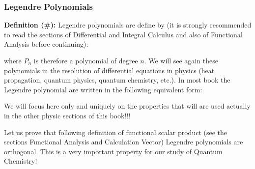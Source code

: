 	\subsubsection{Legendre Polynomials}\label{legendre polynomials}
	\textbf{Definition (\#\mydef):} Legendre polynomials are define by (it is strongly recommended to read the sections of Differential and Integral Calculus and also of Functional Analysis before continuing):
	
	where $P_n$ is therefore a polynomial of degree $n$. We will see again these polynomials in the resolution of differential equations in physics (heat propagation, quantum physics, quantum chemistry, etc.). In most book the Legendre polynomial are written in the following equivalent form:
	
	We will focus here only and uniquely on the properties that will are used actually in the other physic sections of this book!!!
	
	Let us prove that following definition of functional scalar product (see the sections Functional Analysis and Calculation Vector) Legendre polynomials are orthogonal. This is a very important property for our study of Quantum Chemistry!
	
